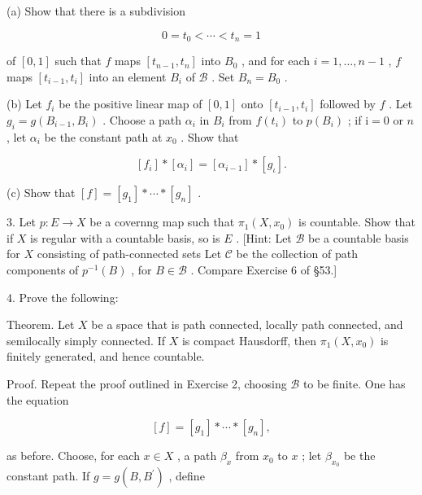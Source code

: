 \documentclass[10pt]{article}
\begin{document}
(a) Show that there is a subdivision

\[
0 = {t}_{0} < \cdots  < {t}_{n} = 1
\]

of \(\left\lbrack  {0,1}\right\rbrack\) such that \(f\) maps \(\left\lbrack  {{t}_{n - 1},{t}_{n}}\right\rbrack\) into \({B}_{0}\) , and for each \(i = 1,\ldots ,n - 1\) , \(f\) maps \(\left\lbrack  {{t}_{i - 1},{t}_{i}}\right\rbrack\) into an element \({B}_{i}\) of \(\mathcal{B}\) . Set \({B}_{n} = {B}_{0}\) .

(b) Let \({f}_{i}\) be the positive linear map of \(\left\lbrack  {0,1}\right\rbrack\) onto \(\left\lbrack  {{t}_{i - 1},{t}_{i}}\right\rbrack\) followed by \(f\) . Let \({g}_{i} = g\left( {{B}_{i - 1},{B}_{i}}\right)\) . Choose a path \({\alpha }_{i}\) in \({B}_{i}\) from \(f\left( {t}_{i}\right)\) to \(p\left( {B}_{i}\right)\) ; if \(\mathrm{i} = 0\) or \(n\) , let \({\alpha }_{i}\) be the constant path at \({x}_{0}\) . Show that

\[
\left\lbrack  {f}_{i}\right\rbrack   * \left\lbrack  {\alpha }_{i}\right\rbrack   = \left\lbrack  {\alpha }_{i - 1}\right\rbrack   * \left\lbrack  {g}_{\iota }\right\rbrack  .
\]

(c) Show that \(\left\lbrack  f\right\rbrack   = \left\lbrack  {g}_{1}\right\rbrack   * \cdots  * \left\lbrack  {g}_{n}\right\rbrack\) .

3. Let \(p : E \rightarrow  X\) be a covernng map such that \({\pi }_{1}\left( {X,{x}_{0}}\right)\) is countable. Show that if \(X\) is regular with a countable basis, so is \(E\) . [Hint: Let \(\mathcal{B}\) be a countable basis for \(X\) consisting of path-connected sets Let \(\mathcal{C}\) be the collection of path components of \({p}^{-1}\left( B\right)\) , for \(B \in  \mathcal{B}\) . Compare Exercise 6 of §53.]

4. Prove the following:

Theorem. Let \(X\) be a space that is path connected, locally path connected, and semilocally simply connected. If \(X\) is compact Hausdorff, then \({\pi }_{1}\left( {X,{x}_{0}}\right)\) is finitely generated, and hence countable.

Proof. Repeat the proof outlined in Exercise 2, choosing \(\mathcal{B}\) to be finite. One has the equation

\[
\left\lbrack  f\right\rbrack   = \left\lbrack  {g}_{1}\right\rbrack   * \cdots  * \left\lbrack  {g}_{n}\right\rbrack  ,
\]

as before. Choose, for each \(x \in  X\) , a path \({\beta }_{x}\) from \({x}_{0}\) to \(x\) ; let \({\beta }_{{x}_{0}}\) be the constant path. If \(g = g\left( {B,{B}^{\prime }}\right)\) , define
\end{document}
